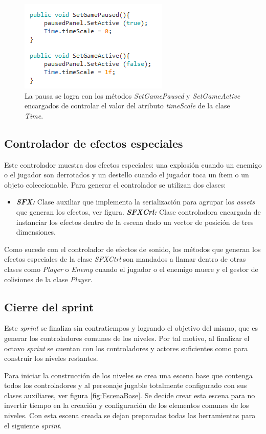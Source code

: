 \begin{figure}[h]
        \centering
        \includegraphics[height=0.2 \textheight]{03TrabajoRealizado/imagenes/Paused.png}
        \caption{La pausa se logra con los métodos \textit{SetGamePaused} y
        \textit{SetGameActive} encargados de controlar el valor del atributo
        \textit{timeScale} de la clase \textit{Time}.}
        \label{fig:pauseMethods}
    \end{figure}
    
\subsection{Controlador de efectos especiales}
Este controlador muestra dos efectos especiales: una explosión cuando un enemigo o el jugador son derrotados y un destello cuando el jugador toca un ítem o un objeto coleccionable. Para generar el controlador se utilizan dos clases:

\begin{itemize}
    \item \textit{\textbf{SFX:}} Clase auxiliar que implementa la serialización para agrupar los \textit{assets} que generan los efectos, ver figura.
    \textit{\textbf{SFXCrl:}} Clase controladora encargada de instanciar los efectos dentro de la escena dado un vector de posición de tres dimensiones.
\end{itemize}

Como sucede con el controlador de efectos de sonido, los métodos que generan los efectos especiales de la clase \textit{SFXCtrl} son mandados a llamar dentro de otras clases como \textit{Player} o \textit{Enemy} cuando el jugador o el enemigo muere y el gestor de colisiones de la clase \textit{Player}.

\subsection{Cierre del sprint}
Este \textit{sprint} se finaliza sin contratiempos y logrando el objetivo del
mismo, que es generar los controladores comunes de los niveles. Por tal motivo, al
finalizar el octavo \textit{sprint} se cuentan con los controladores y actores
suficientes como para construir los niveles restantes.
\\
\par
Para iniciar la construcción de los niveles se crea una escena base que contenga
todos los controladores y al personaje jugable totalmente configurado con sus
clases auxiliares, ver figura \ref{fig:EscenaBase}. Se decide crear esta escena
para no invertir tiempo en la creación y configuración de los elementos comunes
de los niveles. Con esta escena creada se dejan preparadas todas las herramientas
para el siguiente \textit{sprint}.

